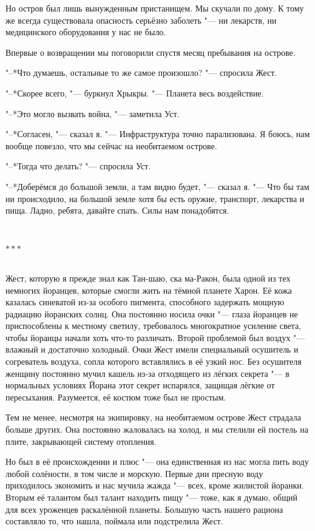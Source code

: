 \documentclass[a4paper,12pt,fleqn]{book}
\newcommand{\razd}{~\\{\centering\Large\bfseries$\ast \ast \ast$\par}~\\}
\begin{document}
Но остров был лишь вынужденным пристанищем.
Мы скучали по дому.
К тому же всегда существовала опасность серьёзно заболеть "--- ни лекарств, ни медицинского оборудования у нас не было.

Впервые о возвращении мы поговорили спустя месяц пребывания на острове.

"--*Что думаешь, остальные то же самое произошло? "--- спросила Жест.

"--*Скорее всего, "--- буркнул Хрыкры.
"--- Планета весь воздействие.

"--*Это могло вызвать война, "--- заметила Уст.

"--*Согласен, "--- сказал я.
"--- Инфраструктура точно парализована.
Я боюсь, нам вообще повезло, что мы сейчас на необитаемом острове.

"--*Тогда что делать? "--- спросила Уст.

"--*Доберёмся до большой земли, а там видно будет, "--- сказал я.
"--- Что бы там ни происходило, на большой земле хотя бы есть оружие, транспорт, лекарства и пища.
Ладно, ребята, давайте спать.
Силы нам понадобятся.

\razd

Жест, которую я прежде знал как Тан-шаю, ска ма-Ракон, была одной из тех немногих йоранцев, которые смогли жить на тёмной планете Харон.
Её кожа казалась синеватой из-за особого пигмента, способного задержать мощную радиацию йоранских солнц.
Она постоянно носила очки "--- глаза йоранцев не приспособлены к местному светилу, требовалось многократное усиление света, чтобы йоранцы начали хоть что-то различать.
Второй проблемой был воздух "--- влажный и достаточно холодный.
Очки Жест имели специальный осушитель и согреватель воздуха, сопла которого вставлялись в её узкий нос.
Без осушителя женщину постоянно мучил кашель из-за отходящего из лёгких секрета "--- в нормальных условиях Йорана этот секрет испарялся, защищая лёгкие от пересыхания.
Разумеется, её костюм тоже был не простым.

Тем не менее, несмотря на экипировку, на необитаемом острове Жест страдала больше других.
Она постоянно жаловалась на холод, и мы стелили ей постель на плите, закрывающей систему отопления.

Но был в её происхождении и плюс "--- она единственная из нас могла пить воду любой солёности, в том числе и морскую.
Первые дни пресную воду приходилось экономить и нас мучила жажда "--- всех, кроме жилистой йоранки.
Вторым её талантом был талант находить пищу "--- тоже, как я думаю, общий для всех уроженцев раскалённой планеты.
Большую часть нашего рациона составляло то, что нашла, поймала или подстрелила Жест.
\end{document}
